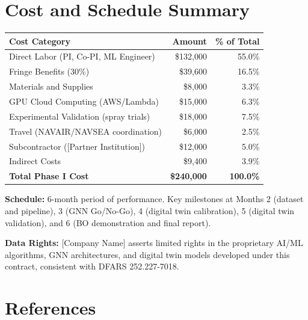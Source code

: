 \documentclass[11pt,letterpaper]{article}
\begin{document}
\section{Cost and Schedule Summary}
\label{sec:cost}

\begin{center}
\begin{tabular}{lrr}
\toprule
\textbf{Cost Category} & \textbf{Amount} & \textbf{\% of Total} \\
\midrule
Direct Labor (PI, Co-PI, ML Engineer) & \$132,000 & 55.0\% \\
Fringe Benefits (30\%) & \$39,600 & 16.5\% \\
Materials and Supplies & \$8,000 & 3.3\% \\
GPU Cloud Computing (AWS/Lambda) & \$15,000 & 6.3\% \\
Experimental Validation (spray trials) & \$18,000 & 7.5\% \\
Travel (NAVAIR/NAVSEA coordination) & \$6,000 & 2.5\% \\
Subcontractor ([Partner Institution]) & \$12,000 & 5.0\% \\
Indirect Costs & \$9,400 & 3.9\% \\
\midrule
\textbf{Total Phase I Cost} & \textbf{\$240,000} & \textbf{100.0\%} \\
\bottomrule
\end{tabular}
\end{center}

\textbf{Schedule:} 6-month period of performance. Key milestones at
Months 2 (dataset and pipeline), 3 (GNN Go/No-Go), 4 (digital twin
calibration), 5 (digital twin validation), and 6 (BO demonstration
and final report).

\textbf{Data Rights:} [Company Name] asserts limited rights in the
proprietary AI/ML algorithms, GNN architectures, and digital twin
models developed under this contract, consistent with DFARS
252.227-7018.

\section*{References}
\label{sec:references}
\end{document}
